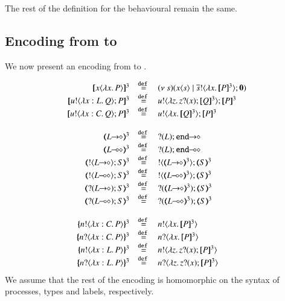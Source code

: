 \noi The rest of the definition for the behavioural remain the same.

\subsection{Encoding from \HOpp to \HOp}

We now present an encoding from \HOpp to \HOp.

\[
\begin{array}{rcl}
	\pmap{\appl{x}{\abs{x} P}}{3} &\defeq& \newsp{s}{\appl{x}{s} \Par \bout{\dual{s}}{\abs{x} \pmap{P}{3}} \inact}
	\\
	\pmap{\bout{u}{\abs{x: L}{Q}} P}{3} &\defeq& \bout{u}{\abs{z}{\binp{z}{x} \pmap{Q}{3}}} \pmap{P}{3}
	\\
	\pmap{\bout{u}{\abs{x: C}{Q}} P}{3} &\defeq& \bout{u}{\abs{x}{\pmap{Q}{3}}} \pmap{P}{3}
	\\
	\\
	\tmap{\shot{L}}{3} &\defeq& \shot{\btinp{L} \tinact}
	\\
	\tmap{\lhot{L}}{3} &\defeq& \lhot{\btinp{L} \tinact}
	\\
	\tmap{\btout{\shot{L}} S}{3} &\defeq& \btout{\tmap{\shot{L}}{3}} \tmap{S}{3}
	\\
	\tmap{\btout{\lhot{L}} S}{3} &\defeq& \btout{\tmap{\lhot{L}}{3}} \tmap{S}{3}
	\\
	\tmap{\btinp{\shot{L}} S}{3} &\defeq& \btinp{\tmap{\shot{L}}{3}} \tmap{S}{3}
	\\
	\tmap{\btinp{\lhot{L}} S}{3} &\defeq& \btinp{\tmap{\lhot{L}}{3}} \tmap{S}{3}
	\\
	\\
	\mapa{\bactout{n}{\abs{x:C}{P}}}^{3} &\defeq& \bactout{n}{\abs{x}{\pmap{P}{3}}}
	\\
	\mapa{\bactinp{n}{\abs{x:C}{P}}}^{3} &\defeq& \bactinp{n}{\abs{x}{\pmap{P}{3}}}
	\\
	\mapa{\bactout{n}{\abs{x:L}{P}}}^{3} &\defeq& \bactout{n}{\abs{z}{\binp{z}{x} \pmap{P}{3}}}
	\\
	\mapa{\bactinp{n}{\abs{x:L}{P}}}^{3} &\defeq& \bactinp{n}{\abs{z}{\binp{z}{x} \pmap{P}{3}}}

\end{array}
\]
\noi We assume that the rest of the encoding is homomorphic on the syntax of
processes, types and labels, respectively.

